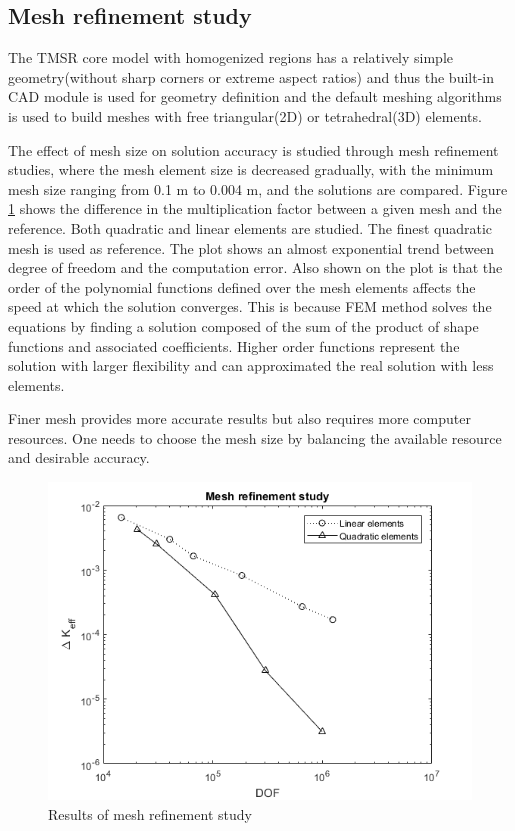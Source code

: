 \documentclass{elsarticle}
\begin{document}
\subsection{Mesh refinement study}
The TMSR core model with homogenized regions has a relatively simple geometry(without sharp corners or extreme aspect ratios) and thus the built-in CAD module is used for geometry definition and the default meshing algorithms is used to build meshes with free triangular(2D) or tetrahedral(3D) elements. 

The effect of mesh size on solution accuracy is studied through mesh refinement studies, where the mesh element size is decreased gradually, with the minimum mesh size ranging from 0.1 m to 0.004 m, and the solutions are compared. 
Figure \ref{fig:mesh_refinement} shows the difference in the multiplication factor between a given mesh and the reference. Both quadratic and linear elements are studied. The finest quadratic mesh is used as reference. The plot shows an almost exponential trend between degree of freedom and the computation error. 
Also shown on the plot is that the order of the polynomial functions defined over the mesh elements affects the speed at which the solution converges. This is because FEM method solves the equations by finding a solution composed of the sum of the product of shape functions and associated coefficients. Higher order functions represent the solution with larger flexibility and can approximated the real solution with less elements. 
 
Finer mesh provides more accurate results but also requires more computer resources. One needs to choose the mesh size by balancing the available resource and desirable accuracy. 

\begin{figure}[ht]
  \centering
  \includegraphics[width = \columnwidth]{./images/diffusion/mesh_refinement.png}
  \caption{Results of mesh refinement study}
  \label{fig:mesh_refinement}
\end{figure}
\end{document}
